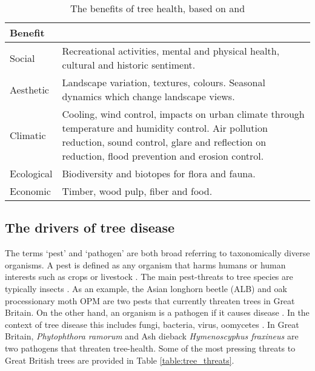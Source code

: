 \begin{table}
    \centering
    \begin{tabular}{|p{3cm}||p{13cm}| }
    \hline
    \textbf{Benefit}&\multicolumn{1}{c|}{}\\
    \hline
    Social  & Recreational activities, mental and physical health, cultural and historic sentiment.\\
    \hline
     Aesthetic & Landscape variation, textures, colours. Seasonal dynamics which change landscape views. \\
    \hline
     Climatic &  Cooling, wind control, impacts on urban climate through temperature and humidity control. Air pollution reduction, sound control, glare and reflection on reduction, flood prevention and erosion control. \\
    \hline
     Ecological & Biodiversity and biotopes for flora and fauna.\\
    \hline
     Economic & Timber, wood pulp, fiber and food.\\
    \hline
    \end{tabular}
    \caption{The benefits of tree health, based on \cite{tyrvainen2005benefits} and \cite{boyd2013consequence}}
    \label{table:tree-health}
\end{table}


\subsection{The drivers of tree disease}


The terms `pest' and `pathogen' are both broad referring to taxonomically diverse organisms. A pest is defined as any organism that harms humans or human interests such as crops or livestock \cite{oerke2006crop, de1964biological, buckle2015rodent}. The main pest-threats to tree species are typically insects \cite{metcalf1994introduction}. As an example, the Asian longhorn beetle (ALB) \cite{haack2010managing} and oak processionary moth OPM \cite{tomlinson2015managing} are two pests that currently threaten trees in Great Britain. On the other hand, an organism is a pathogen if it causes disease \cite{balloux2017q}. In the context of tree disease this includes fungi, bacteria, virus, oomycetes \cite{Boyd1235773}. In Great Britain, \textit{Phytophthora ramorum} \cite{brasier2005phytophthora} and Ash dieback \textit{Hymenoscyphus fraxineus} \cite{mitchell2014ash, ash-dieback-costs} are two pathogens that threaten tree-health. Some of the most pressing threats to Great British trees are provided in Table \ref{table:tree_threats}.\\


